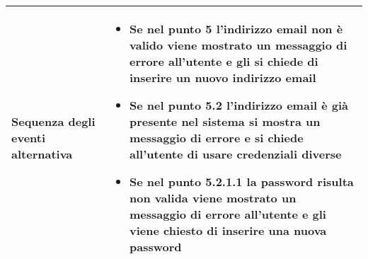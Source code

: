 \begin{tabular}{|p{3cm}|p{7cm}|}
  \hline
  Sequenza degli eventi alternativa & \begin{itemize}
  \item Se nel punto 5 l'indirizzo email non è valido viene mostrato un messaggio di errore all'utente e gli si chiede di inserire un nuovo indirizzo email
\item Se nel punto 5.2 l'indirizzo email è già presente nel sistema si mostra un messaggio di errore e si chiede all'utente di usare credenziali diverse
\item Se nel punto 5.2.1.1 la password risulta non valida viene mostrato un messaggio di errore all'utente e gli viene chiesto di inserire una nuova password
  \end{itemize}\\
\hline
\end{tabular} \\

